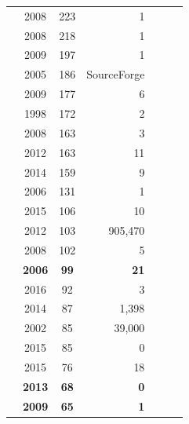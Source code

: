 \documentclass[smallextended]{svjour3}
\newcommand{\cmark}{\ding{51}}%
\newcommand{\xmark}{\ding{55}}%
\begin{document}
\begin{table}
\begin{tabular}{r|@{~}c|@{~}c|@{~}r|@{~}c|@{~}c|@{~}c}
        \cite{Pinzger2008CanDN} & 2008 &	223 &	1 & \cmark & \cmark & \cmark \\
        \cite{Meneely2008PredictingFW} & 2008 &	218 &	1 & \cmark & \cmark & \cmark \\
        \cite{Wolf:2009:PBF:1555001.1555017} & 2009 &	197 &	1 & \xmark & \cmark & \cmark \\
        \cite{1385642} & 2005 &	186 &	SourceForge & \xmark & \xmark & \cmark \\
        \cite{5362091} & 2009 &	177 &	6 & \cmark & \xmark & \cmark \\
        \cite{671604} & 1998 & 172 &	2 & \cmark & \xmark & \xmark \\
        \cite{Weyuker2008} & 2008 & 163 &	3 & \cmark & \cmark & \cmark \\
        \cite{Pamela} & 2012 &	163 &	11 & \cmark & \cmark & \cmark \\
        \cite{Okutan2014} & 2014 &	159 &	9 & \cmark & \cmark & \xmark \\
        \cite{Knab} & 2006 &	131 &	1 & \cmark & \cmark & \xmark \\
        \cite{HE2015170} & 2015 &	106 &	10 & \cmark & \cmark & \xmark \\
        \cite{Majumder_2012} & 2012 &	103 &	905,470 & \xmark & \xmark & \cmark \\
        \cite{Ratzinger:2008:RRS:1370750.1370759} & 2008 &	102 &	5 & \cmark & \xmark & \xmark \\
        \rowcolor{blue!10} \textbf{\cite{robles2006contributor}} & \textbf{2006} &	\textbf{99} & \textbf{21} & \cmark & \xmark & \xmark \\
        \cite{McIntosh2016} & 2016 &	92 &	3 & \xmark & \cmark & \cmark \\
        \cite{fengzhang} & 2014 &	87 &	1,398 & \cmark & \xmark & \xmark \\
        \cite{gregmadey} & 2002 &	85 &	39,000 & \xmark & \xmark & \cmark \\
        \cite{KUPIAINEN2015143} & 2015 &	85 & 0	 & \cmark & \cmark & \cmark \\
        \cite{Madeyski2015} & 2015 &	76 &	18 & \cmark & \cmark & \xmark \\
       \rowcolor{blue!10}  \textbf{\cite{moniruzzaman2013comparative}} & \textbf{2013} &	\textbf{68} & \textbf{0} & \xmark & \cmark & \xmark \\
       \rowcolor{blue!10}  \textbf{\cite{robles2009evolution}} & \textbf{2009} &	\textbf{65} & \textbf{1} & \xmark & \cmark & \cmark \\

\end{tabular}
\end{table}
\end{document}

